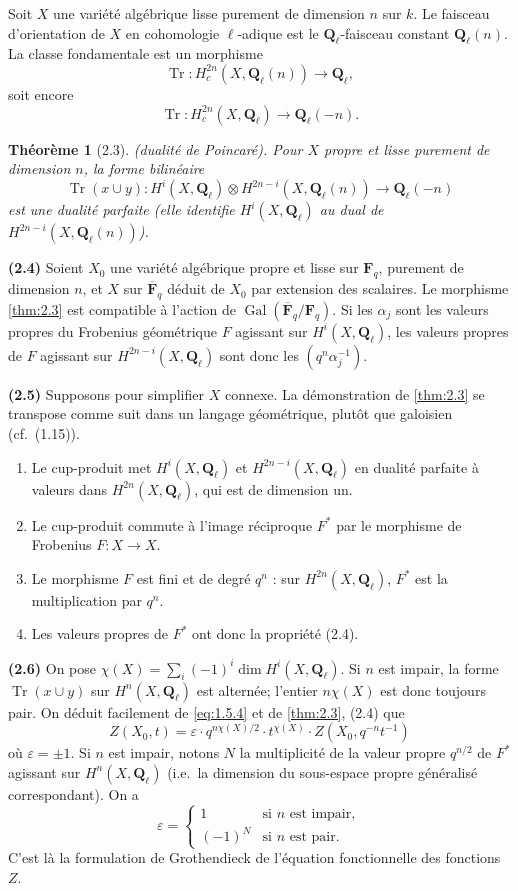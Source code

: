 \documentclass[12pt,a4paper]{amsart}
\theoremstyle{plain}
\newtheorem{theoreme}{Th\'eor\`eme}[section]
\theoremstyle{definition}
\theoremstyle{remark}
\DeclareMathOperator{\Tr}{Tr}
\DeclareMathOperator{\Gal}{Gal}
\newcommand{\Q}{\mathbf{Q}}
\newcommand{\F}{\mathbf{F}}
\numberwithin{equation}{section}
\begin{document}
Soit $X$ une vari\'et\'e alg\'ebrique lisse purement de dimension $n$ sur $k$. Le faisceau d'orientation de $X$ en cohomologie $\ell$-adique est le $\Q_\ell$-faisceau constant $\Q_\ell(n)$. La classe fondamentale est un morphisme
\[
\Tr : H^{2n}_c(X,\Q_\ell(n)) \longrightarrow \Q_\ell,
\]
soit encore
\[
\Tr : H^{2n}_c(X,\Q_\ell) \longrightarrow \Q_\ell(-n).
\]

\begin{theoreme}[2.3]\label{thm:2.3} (dualit\'e de Poincar\'e).
Pour $X$ propre et lisse purement de dimension $n$, la forme bilin\'eaire
\[
\Tr(x\cup y) : H^i(X,\Q_\ell) \otimes H^{2n-i}(X,\Q_\ell(n)) \longrightarrow \Q_\ell(-n)
\]
est une dualit\'e parfaite (elle identifie $H^i(X,\Q_\ell)$ au dual de $H^{2n-i}(X,\Q_\ell(n))$).
\end{theoreme}

\noindent \textbf{(2.4)} Soient $X_0$ une vari\'et\'e alg\'ebrique propre et lisse sur $\F_q$, purement de dimension $n$, et $X$ sur $\overline{\F}_q$ d\'eduit de $X_0$ par extension des scalaires. Le morphisme \eqref{thm:2.3} est compatible \`a l'action de $\Gal(\overline{\F}_q/\F_q)$. Si les $\alpha_j$ sont les valeurs propres du Frobenius g\'eom\'etrique $F$ agissant sur $H^i(X,\Q_\ell)$, les valeurs propres de $F$ agissant sur $H^{2n-i}(X,\Q_\ell)$ sont donc les $(q^n\alpha_j^{-1})$.

\noindent \textbf{(2.5)} Supposons pour simplifier $X$ connexe. La d\'emonstration de \eqref{thm:2.3} se transpose comme suit dans un langage g\'eom\'etrique, plut\^ot que galoisien (cf.\ (1.15)).

\begin{enumerate}
\item[a)] Le cup-produit met $H^i(X,\Q_\ell)$ et $H^{2n-i}(X,\Q_\ell)$ en dualit\'e parfaite \`a valeurs dans $H^{2n}(X,\Q_\ell)$, qui est de dimension un.
\item[b)] Le cup-produit commute \`a l'image r\'eciproque $F^*$ par le morphisme de Frobenius $F:X\to X$.
\item[c)] Le morphisme $F$ est fini et de degr\'e $q^n$ : sur $H^{2n}(X,\Q_\ell)$, $F^*$ est la multiplication par $q^n$.
\item[d)] Les valeurs propres de $F^*$ ont donc la propri\'et\'e (2.4).
\end{enumerate}

\noindent \textbf{(2.6)} On pose $\chi(X)=\sum_i (-1)^i\dim H^i(X,\Q_\ell)$. Si $n$ est impair, la forme $\Tr(x\cup y)$ sur $H^n(X,\Q_\ell)$ est altern\'ee; l'entier $n\chi(X)$ est donc toujours pair. On d\'eduit facilement de \eqref{eq:1.5.4} et de \eqref{thm:2.3}, (2.4) que
\[
Z(X_0,t) = \varepsilon \cdot q^{n\chi(X)/2} \cdot t^{\chi(X)} \cdot Z(X_0,q^{-n}t^{-1})
\]
o\`u $\varepsilon=\pm 1$. Si $n$ est impair, notons $N$ la multiplicit\'e de la valeur propre $q^{n/2}$ de $F^*$ agissant sur $H^n(X,\Q_\ell)$ (i.e.\ la dimension du sous-espace propre g\'en\'eralis\'e correspondant). On a
\[
\varepsilon = \begin{cases} 1 & \text{si $n$ est impair}, \\ (-1)^N & \text{si $n$ est pair}. \end{cases}
\]
C'est l\`a la formulation de Grothendieck de l'\'equation fonctionnelle des fonctions $Z$.
\end{document}
